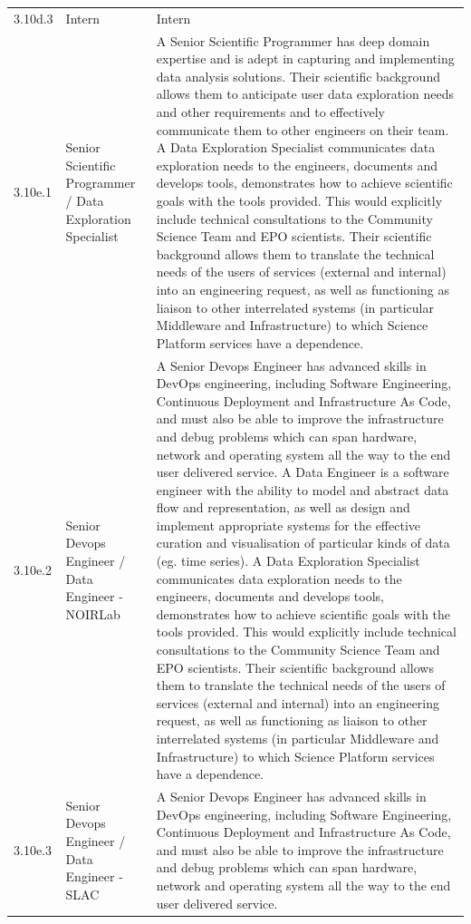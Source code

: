 \begin{longtable} {|p{}|p{}|p{}|}
{} \\ \hline
{3.10d.3}&{Intern}&{Intern} \\ \hline
{3.10e.1}&{Senior Scientific Programmer / Data Exploration Specialist}&{A Senior Scientific Programmer has deep domain expertise and is adept in capturing and implementing data analysis solutions. Their scientific background allows them to anticipate user data exploration needs and other requirements and to effectively communicate them to other engineers on their team.
A Data Exploration Specialist communicates data exploration needs to the engineers, documents and develops tools, demonstrates how to achieve scientific goals with the tools provided. This would explicitly include technical consultations to the Community Science Team and EPO scientists. Their scientific background allows them to translate the technical needs of the users of services (external and internal) into an engineering request, as well as functioning as liaison to other interrelated systems (in particular Middleware and Infrastructure) to which Science Platform services have a dependence.
} \\ \hline
{3.10e.2}&{Senior Devops Engineer / Data Engineer - NOIRLab}&{A Senior Devops Engineer has advanced skills in DevOps engineering, including Software Engineering, Continuous Deployment and Infrastructure As Code, and must also be able to improve the infrastructure and debug problems which can span hardware, network and operating system all the way to the end user delivered service.
A Data Engineer is a software engineer with the ability to model and abstract data flow and representation, as well as design and implement appropriate systems for the effective curation and visualisation of particular kinds of data (eg. time series). 
A Data Exploration Specialist communicates data exploration needs to the engineers, documents and develops tools, demonstrates how to achieve scientific goals with the tools provided. This would explicitly include technical consultations to the Community Science Team and EPO scientists. Their scientific background allows them to translate the technical needs of the users of services (external and internal) into an engineering request, as well as functioning as liaison to other interrelated systems (in particular Middleware and Infrastructure) to which Science Platform services have a dependence.} \\ \hline
{3.10e.3}&{Senior Devops Engineer / Data Engineer - SLAC}&{A Senior Devops Engineer has advanced skills in DevOps engineering, including Software Engineering, Continuous Deployment and Infrastructure As Code, and must also be able to improve the infrastructure and debug problems which can span hardware, network and operating system all the way to the end user delivered service.
}
\end{longtable}
